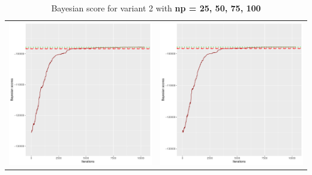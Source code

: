 \documentclass[]{scrartcl}
\begin{document}
\begin{table}[h!]
\begin{tabular}{cc}
\includegraphics[scale = 0.4]{./figs/hepar2/v2/75/bayBoundsEvolution-10352.pdf} & 
\includegraphics[scale = 0.4]{./figs/hepar2/v2/100/bayBoundsEvolution-10352.pdf} \\
\end{tabular}
\caption{Bayesian score for variant 2 with \textbf{np =  25, 50, 75, 100}}
\end{table}
\end{document}
